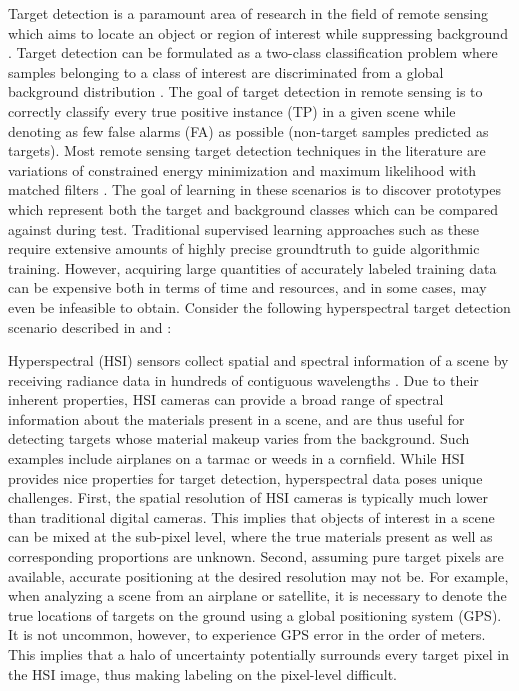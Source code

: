 Target detection is a paramount area of research in the field of remote sensing which aims to locate an object or region of interest while suppressing background \cite{Geng2017TargetDetection,Chaudhuri1995TargetDetection}.  Target detection can be formulated as a two-class classification problem where samples belonging to a class of interest are discriminated from a global background distribution \cite{Zare2016MIACE}.  The goal of target detection in remote sensing is to correctly classify every true positive instance (TP) in a given scene while denoting as few false alarms (FA) as possible (non-target samples predicted as targets).  Most remote sensing target detection techniques in the literature are variations of constrained energy minimization and maximum likelihood with matched filters \cite{Geng2017TargetDetection,Chaudhuri1995TargetDetection}. The goal of learning in these scenarios is to discover prototypes which represent both the target and background classes which can be compared against during test.  Traditional supervised learning approaches such as these require extensive amounts of highly precise groundtruth to guide algorithmic training.  However, acquiring large quantities  of accurately labeled training data can be expensive both in terms of time and resources, and in some cases, may even be infeasible to obtain.  Consider the following hyperspectral target detection scenario described in \cite{Du2017Thesis} and \cite{Bocinsky2019Thesis}:  

Hyperspectral (HSI) sensors collect spatial and spectral information of a scene by receiving radiance data in hundreds of contiguous wavelengths \cite{Zare2008Thesis}.  Due to their inherent properties, HSI cameras can provide a broad range of spectral information about the materials present in a scene, and are thus useful for detecting targets whose material makeup varies from the background.  Such examples include airplanes on a tarmac or weeds in a cornfield.  While HSI provides nice properties for target detection, hyperspectral data poses unique challenges.  First, the spatial resolution of HSI cameras is typically much lower than traditional digital cameras.  This implies that objects of interest in a scene can be mixed at the sub-pixel level, where the true materials present as well as corresponding proportions are unknown. Second, assuming pure target pixels are available, accurate positioning at the desired resolution may not be.  For example, when analyzing a scene from an airplane or satellite, it is necessary to denote the true locations of targets on the ground using a global positioning system (GPS). It is not uncommon, however, to experience GPS error in the order of meters.  This implies that a halo of uncertainty potentially surrounds every target pixel in the HSI image, thus making labeling on the pixel-level difficult.

